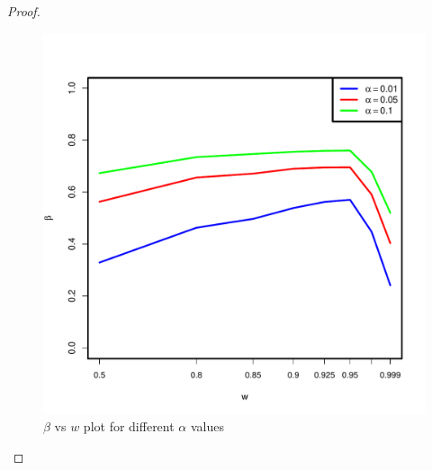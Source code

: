 \documentclass[12pt]{article} %
\begin{document}
\begin{proof}
\begin{figure}[h]
      \centering
         \includegraphics[scale=0.35]{OOSMVN-power-w-c0.pdf}
\caption{$\beta$ vs $w$ plot for different $\alpha$ values }
\label{fig:MVN-c0-power-w}
      

  \end{figure}

\end{proof}
\end{document}
